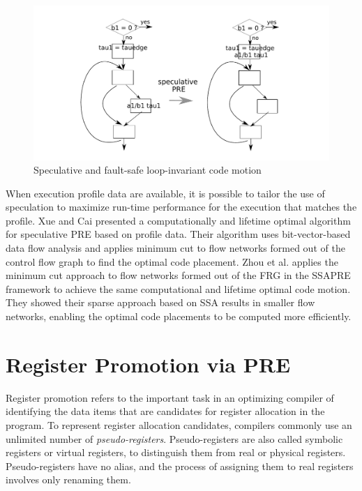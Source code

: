 \begin{figure}
\centering
\includegraphics[scale=0.55]{fig-spec-div.pdf}
\caption{Speculative and fault-safe loop-invariant code motion}
\label{fig: spec-div}
\end{figure}

When execution profile data are available, it is possible to tailor the use
of speculation to maximize run-time performance for the execution 
that matches the profile.  Xue and Cai presented a computationally 
and lifetime optimal algorithm
for speculative PRE based on profile data\cite{Xue06}.  Their algorithm
uses bit-vector-based data flow analysis and applies minimum cut to flow
networks formed out of the control flow graph to find the optimal code
placement.  Zhou {et al.} applies the 
minimum cut approach to flow networks formed out of the FRG in the SSAPRE 
framework to achieve the same computational and lifetime optimal code 
motion\cite{zhou11}.  They showed their sparse approach based on SSA results
in smaller flow networks, enabling the optimal code placements to be 
computed more efficiently.

\section{Register Promotion via PRE}

Register promotion refers to the important task in an optimizing compiler
of identifying the data items that are candidates for register allocation 
in the program.  To represent register allocation candidates, compilers
commonly use an unlimited number of \emph{pseudo-registers}.  Pseudo-registers
are also called symbolic registers or virtual registers, to distinguish them
from real or physical registers.  Pseudo-registers have no alias, and the
process of assigning them to real registers involves only renaming them.

